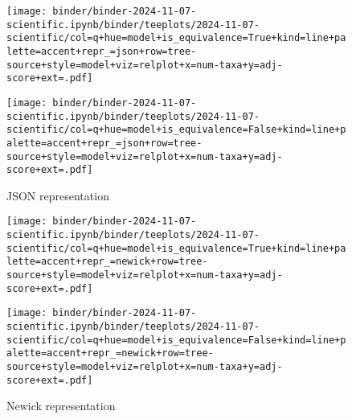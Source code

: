 \begin{figure*}

\begin{subfigure}{\textwidth}
\begin{minipage}[b]{0.7365\textwidth}
\texttt{[image: binder/binder-2024-11-07-scientific.ipynb/binder/teeplots/2024-11-07-scientific/col=q+hue=model+is\_equivalence=True+kind=line+palette=accent+repr\_=json+row=tree-source+style=model+viz=relplot+x=num-taxa+y=adj-score+ext=.pdf]}
\end{minipage}%
\begin{minipage}[b]{0.01\textwidth}
\end{minipage}
\begin{minipage}[b]{0.2535\textwidth}
\texttt{[image: binder/binder-2024-11-07-scientific.ipynb/binder/teeplots/2024-11-07-scientific/col=q+hue=model+is\_equivalence=False+kind=line+palette=accent+repr\_=json+row=tree-source+style=model+viz=relplot+x=num-taxa+y=adj-score+ext=.pdf]}
\end{minipage}
\caption{\footnotesize JSON representation}
\label{fig:models:json}
\end{subfigure}

\begin{subfigure}{\textwidth}
\begin{minipage}[b]{0.7365\textwidth}
\texttt{[image: binder/binder-2024-11-07-scientific.ipynb/binder/teeplots/2024-11-07-scientific/col=q+hue=model+is\_equivalence=True+kind=line+palette=accent+repr\_=newick+row=tree-source+style=model+viz=relplot+x=num-taxa+y=adj-score+ext=.pdf]}
\end{minipage}%
\begin{minipage}[b]{0.01\textwidth}
\end{minipage}
\begin{minipage}[b]{0.2535\textwidth}
\texttt{[image: binder/binder-2024-11-07-scientific.ipynb/binder/teeplots/2024-11-07-scientific/col=q+hue=model+is\_equivalence=False+kind=line+palette=accent+repr\_=newick+row=tree-source+style=model+viz=relplot+x=num-taxa+y=adj-score+ext=.pdf]}
\end{minipage}
\caption{\footnotesize Newick representation}
\label{fig:models:newick}
\end{subfigure}


\end{figure*}
